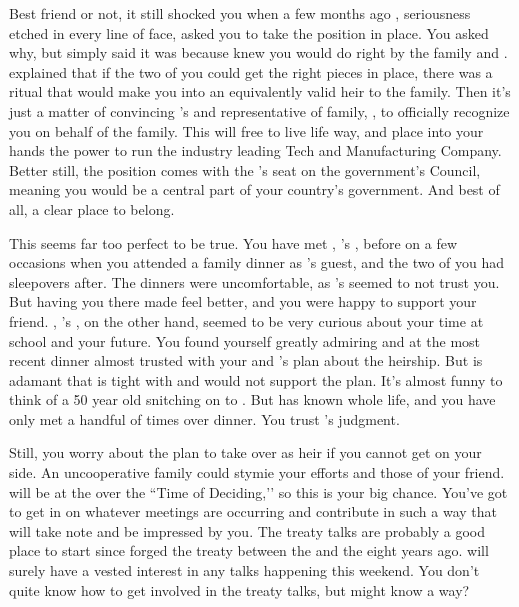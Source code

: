 \documentclass[char]{GL2020}
\begin{document}
Best friend or not, it still shocked you when a few months ago \cHeir{}, seriousness etched in every line of \cHeir{\their} face, asked you to take the position in \cHeir{\their} place. You asked \cHeir{\them} why, but \cHeir{\they} simply said it was because \cHeir{\they} knew you would do right by the family and \cTechGod{}. \cHeir{} explained that if the two of you could get the right pieces in place, there was a ritual that would make you into an equivalently valid heir to the family. Then it's just a matter of convincing \cHeir{}’s \cDiplomat{\auncle} and representative of \cHeir{\their} family, \cDiplomat{\intro}, to officially recognize you on behalf of the family. This will free \cHeir{} to live life \cHeir{\their} way, and place into your hands the power to run the industry leading \cHeir{\formal} Tech and Manufacturing Company. Better still, the position comes with the \cHeir{\formal}'s seat on the government's Council, meaning you would be a central part of your country's government. And best of all, a clear place to belong.

This seems far too perfect to be true. You have met \cFaledonParent{\full}, \cHeir{}’s \cFaledonParent{\parent}, before on a few occasions when you attended a \cHeir{\formal} family dinner as \cHeir{}’s guest, and the two of you had sleepovers after. The dinners were uncomfortable, as \cHeir{}'s \cFaledonParent{\parent} seemed to not trust you. But having you there made \cHeir{} feel better, and you were happy to support your friend. \cDiplomat{\full}, \cHeir{}’s \cDiplomat{\auncle}, on the other hand, seemed to be very curious about your time at school and your future. You found yourself greatly admiring \cDiplomat{\them} and at the most recent dinner almost trusted \cDiplomat{\them} with your and \cHeir{}’s plan about the heirship. But \cHeir{} is adamant that \cDiplomat{} is tight with \cDiplomat{\their} \cFaledonParent{\sibling} and would not support the plan. It’s almost funny to think of a 50 year old \cDiplomat{\person} snitching on \cDiplomat{\their} \cHeir{\nibling} to \cHeir{\their} \cFaledonParent{\parent}. But \cHeir{} has known \cDiplomat{} \cHeir{\their} whole life, and you have only met \cDiplomat{} a handful of times over dinner. You trust \cHeir{}’s judgment.

Still, you worry about the plan to take over as heir if you cannot get \cDiplomat{} on your side. An uncooperative \cHeir{\formal} family could stymie your efforts and those of your friend. \cDiplomat{} will be at the \pSchool{} over the ``Time of Deciding,’’ so this is your big chance. You've got to get in on whatever meetings are occurring and contribute in such a way that \cDiplomat{} will take note and be impressed by you. The treaty talks are probably a good place to start since \cDiplomat{\they} forged the treaty between the \pTech{} and the \pFarm{} eight years ago. \cDiplomat{\They} will surely have a vested interest in any talks happening this weekend.  You don’t quite know how to get involved in the treaty talks, but \cHeir{} might know a way?
\end{document}
